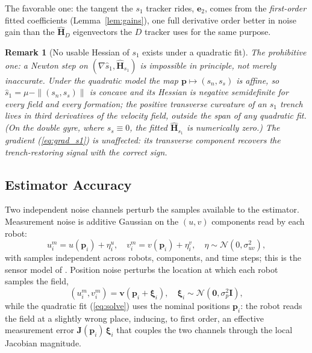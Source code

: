 \documentclass[lettersize,journal]{IEEEtran}
\newtheorem{remark}{Remark}
\begin{document}
The favorable one: the tangent the $s_1$ tracker rides,
$\mathbf{e}_2$, comes from the \emph{first-order} fitted coefficients
(Lemma~\ref{lem:gains}), one full derivative order better in noise gain
than the $\hat{\mathbf{H}}_D$ eigenvectors the $D$ tracker uses for the
same purpose.

\begin{remark}[No usable Hessian of $s_1$ exists under a quadratic fit]
\label{rem:s1hess}
The prohibitive one: a Newton step on $(\nabla \hat{s}_1,
\hat{\mathbf{H}}_{s_1})$ is impossible in principle, not merely
inaccurate. Under the quadratic model the map $\mathbf{p} \mapsto (s_n,
s_s)$ is affine, so $\hat{s}_1 = \mu - \|(s_n, s_s)\|$ is concave and its
Hessian is negative semidefinite \emph{for every field and every
formation}; the positive transverse curvature of an $s_1$ trench lives
in third derivatives of the velocity field, outside the span of any
quadratic fit. (On the double gyre, where $s_s \equiv 0$, the fitted
$\hat{\mathbf{H}}_{s_1}$ is numerically zero.) The gradient
(\ref{eq:grad_s1}) is unaffected: its transverse component recovers the
trench-restoring signal with the correct sign.
\end{remark}

\subsection{Estimator Accuracy}
\label{sec:sensitivity}

Two independent noise channels perturb the samples available to the
estimator. Measurement noise is additive Gaussian on the $(u, v)$
components read by each robot:
\begin{equation}
    u_i^m = u(\mathbf{p}_i) + \eta_i^u, \quad
    v_i^m = v(\mathbf{p}_i) + \eta_i^v,
    \quad \eta \sim \mathcal{N}(0, \sigma_{uv}^2),
    \label{eq:meas_noise}
\end{equation}
with samples independent across robots, components, and time steps; this
is the sensor model of \cite{9}. Position noise perturbs the location at
which each robot samples the field,
\begin{equation}
    (u_i^m, v_i^m) = \mathbf{v}(\mathbf{p}_i + \boldsymbol{\xi}_i), \quad
    \boldsymbol{\xi}_i \sim \mathcal{N}(\mathbf{0}, \sigma_p^2 \mathbf{I}),
    \label{eq:pos_noise}
\end{equation}
while the quadratic fit (\ref{eq:solve}) uses the nominal positions
$\mathbf{p}_i$: the robot reads the field at a slightly wrong place,
inducing, to first order, an effective measurement error
$\mathbf{J}(\mathbf{p}_i)\,\boldsymbol{\xi}_i$ that couples the two
channels through the local Jacobian magnitude.
\end{document}
